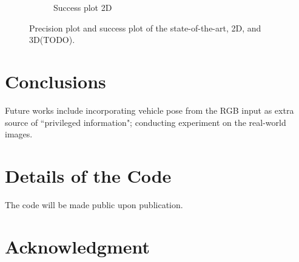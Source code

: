 \documentclass[10pt,twocolumn,letterpaper]{article}
\begin{document}
\begin{figure}[t]
\begin{subfigure}[c]{0.4\textwidth}
        \caption{\small{Success plot 2D}}
    \end{subfigure}
\caption{Precision plot and success plot of the state-of-the-art, 2D, and 3D(TODO).
}
\label{fig:precision_plot_and_success_plot_OBT100}
\end{figure}

\section{Conclusions}

Future works include incorporating vehicle pose from the RGB input as extra source of ``privileged information"; conducting experiment on the real-world images.

\section*{Details of the Code}
 The code will be made public upon publication.

\section*{Acknowledgment}

{\small


}
\end{document}
